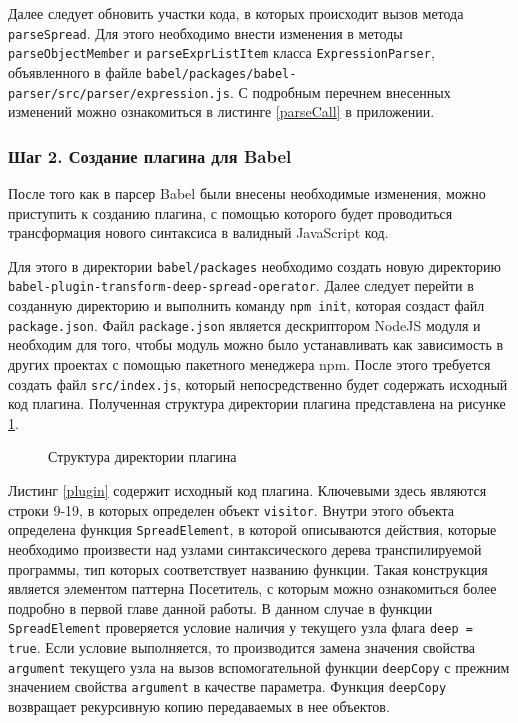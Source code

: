 \documentclass[14pt, a4paper]{article}
\def\code#1{\texttt{#1}} %
\begin{document}
Далее следует обновить участки кода, в которых происходит вызов метода \code{parseSpread}. Для этого
необходимо внести изменения в методы \code{parseObjectMember} и \code{parseExprListItem} класса \code{ExpressionParser},
\linebreak объявленного в файле \code{babel/packages/babel-parser/src/parser\linebreak/expression.js}.
С подробным перечнем внесенных изменений можно ознакомиться в листинге \ref{parseCall} в приложении.

\subsubsection*{Шаг 2. Создание плагина для Babel}
После того как в парсер Babel были внесены необходимые изменения, можно приступить к созданию плагина,
с помощью которого будет проводиться трансформация нового синтаксиса в валидный JavaScript код.

Для этого в директории \code{babel/packages} необходимо создать новую директорию \code{babel-plugin-transform-deep-spread-operator}.
Далее следует перейти в созданную директорию и выполнить команду \code{npm init}, которая создаст
файл \code{package.json}. Файл \code{package.json} является дескриптором NodeJS модуля и необходим
для того, чтобы модуль можно было устанавливать как зависимость в других проектах с помощью пакетного
менеджера npm. После этого требуется создать файл \code{src/index.js}, который непосредственно будет
содержать исходный код плагина. Полученная структура директории плагина представлена на рисунке \ref{babel_plugin_dirs}.

\begin{figure}[H]
  \centering
  \caption{Структура директории плагина}
  \label{babel_plugin_dirs}
\end{figure}

Листинг \ref{plugin} содержит исходный код плагина. Ключевыми здесь являются строки 9-19, в которых определен
объект \code{visitor}. Внутри этого объекта определена функция \code{SpreadElement}, в которой описываются
действия, которые необходимо произвести над узлами синтаксического дерева транспилируемой программы,
тип которых соответствует названию функции. Такая конструкция является элементом паттерна Посетитель, с которым
можно ознакомиться более подробно в первой главе данной работы. В данном случае в функции \code{SpreadElement}
проверяется условие наличия у текущего узла флага \code{deep = true}. Если условие выполняется, то
производится замена значения свойства \code{argument} текущего узла на вызов вспомогательной функции \code{deepCopy}
с прежним значением свойства \code{argument} в качестве параметра.
Функция \code{deepCopy} возвращает рекурсивную копию передаваемых в нее объектов.
\end{document}

